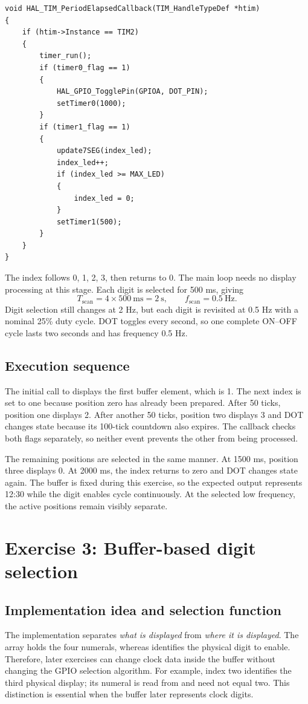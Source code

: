 \documentclass[a4paper]{article}
\newcommand{\code}[1]{\texttt{\detokenize{#1}}}
\newcommand{\topic}[1]{\subsection{#1}}
\begin{document}
\par\noindent\begin{minipage}{\linewidth}
\begin{lstlisting}[caption={Four-digit timer callback}]
void HAL_TIM_PeriodElapsedCallback(TIM_HandleTypeDef *htim)
{
    if (htim->Instance == TIM2)
    {
        timer_run();
        if (timer0_flag == 1)
        {
            HAL_GPIO_TogglePin(GPIOA, DOT_PIN);
            setTimer0(1000);
        }
        if (timer1_flag == 1)
        {
            update7SEG(index_led);
            index_led++;
            if (index_led >= MAX_LED)
            {
                index_led = 0;
            }
            setTimer1(500);
        }
    }
}
\end{lstlisting}
\end{minipage}\par
The index follows 0, 1, 2, 3, then returns to 0. The main loop needs no display
processing at this stage. Each digit is selected for 500 ms, giving
\[
T_{\mathrm{scan}}=4\times500\ \mathrm{ms}=2\ \mathrm{s},\qquad
f_{\mathrm{scan}}=0.5\ \mathrm{Hz}.
\]
Digit selection still changes at 2 Hz, but each digit is revisited at 0.5 Hz
with a nominal 25\% duty cycle. DOT toggles every second, so one complete
ON--OFF cycle lasts two seconds and has frequency 0.5 Hz.

\topic{Execution sequence}
The initial call to \code{update7SEG(0)} displays the first buffer element,
which is 1. The next index is set to one because position zero has already
been prepared. After 50 ticks, position one displays 2. After another 50
ticks, position two displays 3 and DOT changes state because its 100-tick
countdown also expires. The callback checks both flags separately, so neither
event prevents the other from being processed.

The remaining positions are selected in the same manner. At 1500 ms,
position three displays 0. At 2000 ms, the index returns to zero and DOT
changes state again. The buffer is fixed during this exercise, so the
expected output represents 12:30 while the digit enables cycle continuously.
At the selected low frequency, the active positions remain visibly separate.

\section{Exercise 3: Buffer-based digit selection}
\topic{Implementation idea and selection function}
The implementation separates \emph{what is displayed} from \emph{where it is
displayed}. The array \code{led_buffer} holds the four numerals, whereas
\code{index_led} identifies the physical digit to enable. Therefore, later
exercises can change clock data inside the buffer without changing the GPIO
selection algorithm. For example, index two identifies the third physical
display; its numeral is read from \code{led_buffer[2]} and need not equal two.
This distinction is essential when the buffer later represents clock digits.
\end{document}
